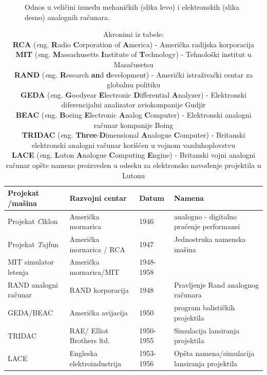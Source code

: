 \documentclass[a4paper]{article}
\begin{document}
{\begin{figure}[!h]
				\caption{Odnos u veličini između mehaničkih (slika levo) i elektronskih (slika desno) analognih  računara.}
				\label{fig:aVSe}
		\end{figure}

		\begin{table}[h!]
			\begin{center}
				\begin{tabular}{| m{2cm} | m{4cm} | m{1cm} | m{4cm} |}
					\hline
					Projekat /mašina & Razvojni centar & Datum & Namena \\
					\hline
					Projekat \emph Ciklon & Američka mornarica & 1946 & analogno - digitalno praćenje performansi \\
					\hline
					Projekat \emph Tajfun & Američka mornarica / RCA & 1947 & Jednostruka namenska mašina \\
					\hline
					MIT simulator letenja & Američka mornarica/MIT & 1948- 1958 & \\
					\hline
					RAND analogni računar & RAND korporacija & 1948 & Pravljenje Rand analognog računara \\
					\hline
					GEDA/BEAC &  Američka avijacija & 1950 & program balističkih projektila \\
					\hline
					TRIDAC & RAE/ Elliot Brothers ltd. & 1950- 1955 & Simulacija lansiranja projektila \\
					\hline
					LACE & Engleska elektroindustrija & 1953- 1956 & Opšta namena/simulacija lansiranja projektila \\ 
					\hline
				\end{tabular}
				\label{tab:tableEAR}
				\caption{
						Akronimi iz tabele: \\
						\textbf{RCA} (\textit eng. \textbf Radio \textbf Corporation of \textbf America) - Američka radijska korporacija \\
						\textbf{MIT} (\textit eng. \textbf Massachusetts \textbf Institute of \textbf Technology) - Tehnološki institut u Masačusetsu  \\
						\textbf{RAND} (\textit eng. \textbf Research \textbf{an}d \textbf development) - Američki istraživački centar za globalnu politiku \\
						\textbf{GEDA} (\textit eng. \textbf Goodyear \textbf Electronic \textbf Differential \textbf Analyzer) - Elektronski diferencijalni analizator aviokompanije Gudjir \\
						\textbf{BEAC} (\textit eng. \textbf Boeing \textbf Electronic \textbf Analog \textbf Computer) - Elektronski analogni računar kompanije Boing \\
						\textbf{TRIDAC} (\textit eng. \textbf {Three}-\textbf Dimensional \textbf Analogue \textbf Computer) - Britanski elektronski analogni računar korišćen u vojnom vazduhoplovstvu \\
						\textbf{LACE} (\textit eng. \textbf Luton \textbf Analogue \textbf Computing \textbf Engine) - Britanski vojni analogni računar opšte namene proizveden u odseku za elektronsko navođenje projektila u Lutonu 
						}
			\end{center}
		\end{table}

}
\end{document}
